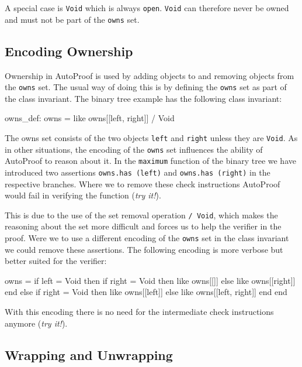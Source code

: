 \documentclass[a4paper,12pt]{article}
\newcommand{\AutoProof}{Auto\-Proof\xspace}
\newcommand{\e}[1]{\mbox{\lstinline[language=Eiffel]|#1|}}
\begin{document}
A special case is \e{Void} which is always \e{open}. \e{Void} can therefore never be owned and must not be part of the \e{owns} set.

\subsection{Encoding Ownership}

Ownership in \AutoProof is used by adding objects to and removing objects from the \e{owns} set. The usual way of doing this is by defining the \e{owns} set as part of the class invariant. The binary tree example has the following class invariant:
\begin{erunning}[numbers=none]
owns_def: owns = {like owns}[[left, right]] / Void
\end{erunning}
The owns set consists of the two objects \e{left} and \e{right} unless they are \e{Void}. As in other situations, the encoding of the \e{owns} set influences the ability of \AutoProof to reason about it. In the \e{maximum} function of the binary tree we have introduced two assertions \e{owns.has (left)} and \e{owns.has (right)} in the respective branches. Where we to remove these check instructions \AutoProof would fail in verifying the function (\emph{try it!}). 

This is due to the use of the set removal operation \e{/ Void}, which makes the reasoning about the set more difficult and forces us to help the verifier in the proof. Were we to use a different encoding of the \e{owns} set in the class invariant we could remove these assertions. The following encoding is more verbose but better suited for the verifier:
\begin{erunning}[basicstyle=\footnotesize]
owns =
	if left = Void then
		if right = Void then {like owns}[[]] else {like owns}[[right]] end
	else
		if right = Void then {like owns}[[left]] else {like owns}[[left, right]] end
	end
\end{erunning}
With this encoding there is no need for the intermediate check instructions anymore (\emph{try it!}).

\subsection{Wrapping and Unwrapping} \label{sec:wrapping}
\end{document}
